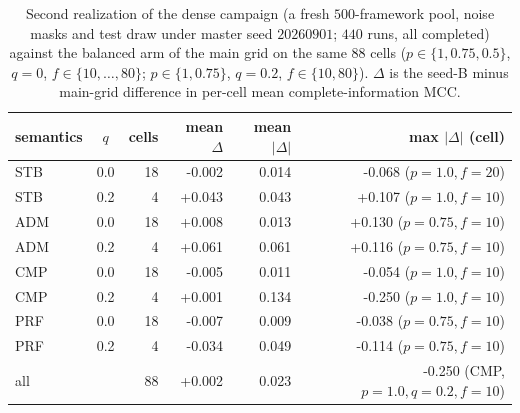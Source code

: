 \begin{table}[t]
\centering
\footnotesize
\caption{Second realization of the dense campaign (a fresh $500$-framework pool,
noise masks and test draw under master seed $20260901$; $440$ runs, all completed)
against the balanced arm of the main grid on the same $88$ cells
($p\in\{1,0.75,0.5\}$, $q{=}0$, $f\in\{10,\dots,80\}$; $p\in\{1,0.75\}$,
$q{=}0.2$, $f\in\{10,80\}$). $\Delta$ is the seed-B minus main-grid difference
in per-cell mean complete-information MCC.}
\label{tab:seedb}
\begin{tabular}{lcrrrr}
\toprule
semantics & $q$ & cells & mean $\Delta$ & mean $|\Delta|$ & max $|\Delta|$ (cell)\\
\midrule
STB & 0.0 & 18 & -0.002 & 0.014 & -0.068 ($p{=}1.0,f{=}20$)\\
STB & 0.2 & 4 & +0.043 & 0.043 & +0.107 ($p{=}1.0,f{=}10$)\\
ADM & 0.0 & 18 & +0.008 & 0.013 & +0.130 ($p{=}0.75,f{=}10$)\\
ADM & 0.2 & 4 & +0.061 & 0.061 & +0.116 ($p{=}0.75,f{=}10$)\\
CMP & 0.0 & 18 & -0.005 & 0.011 & -0.054 ($p{=}1.0,f{=}10$)\\
CMP & 0.2 & 4 & +0.001 & 0.134 & -0.250 ($p{=}1.0,f{=}10$)\\
PRF & 0.0 & 18 & -0.007 & 0.009 & -0.038 ($p{=}0.75,f{=}10$)\\
PRF & 0.2 & 4 & -0.034 & 0.049 & -0.114 ($p{=}0.75,f{=}10$)\\
\midrule
all & & 88 & +0.002 & 0.023 & -0.250 (CMP, $p{=}1.0,q{=}0.2,f{=}10$)\\
\bottomrule\end{tabular}\end{table}

